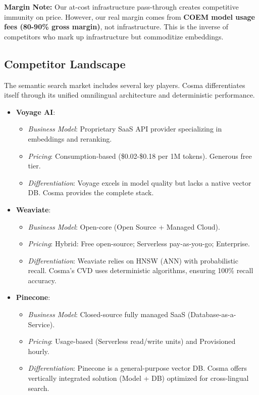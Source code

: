 \textbf{Margin Note:} Our at-cost infrastructure pass-through creates competitive immunity on price. However, our real margin comes from \textbf{COEM model usage fees (80-90\% gross margin)}, not infrastructure. This is the inverse of competitors who mark up infrastructure but commoditize embeddings.

\subsection{Competitor Landscape}

The semantic search market includes several key players. Cosma differentiates itself through its unified omnilingual architecture and deterministic performance.

\begin{itemize}
    \item \textbf{Voyage AI}:
    \begin{itemize}[noitemsep]
        \item \textit{Business Model}: Proprietary SaaS API provider specializing in embeddings and reranking.
        \item \textit{Pricing}: Consumption-based (\$0.02-\$0.18 per 1M tokens). Generous free tier.
        \item \textit{Differentiation}: Voyage excels in model quality but lacks a native vector DB. Cosma provides the complete stack.
    \end{itemize}

    \item \textbf{Weaviate}:
    \begin{itemize}[noitemsep]
        \item \textit{Business Model}: Open-core (Open Source + Managed Cloud).
        \item \textit{Pricing}: Hybrid: Free open-source; Serverless pay-as-you-go; Enterprise.
        \item \textit{Differentiation}: Weaviate relies on HNSW (ANN) with probabilistic recall. Cosma's CVD uses deterministic algorithms, ensuring 100\% recall accuracy.
    \end{itemize}

    \item \textbf{Pinecone}:
    \begin{itemize}[noitemsep]
        \item \textit{Business Model}: Closed-source fully managed SaaS (Database-as-a-Service).
        \item \textit{Pricing}: Usage-based (Serverless read/write units) and Provisioned hourly.
        \item \textit{Differentiation}: Pinecone is a general-purpose vector DB. Cosma offers vertically integrated solution (Model + DB) optimized for cross-lingual search.
    \end{itemize}


\end{itemize}
